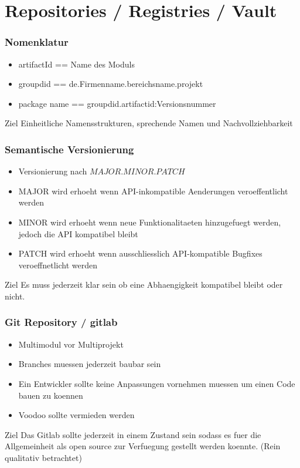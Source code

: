 \section{Repositories / Registries / Vault}
\begin{frame}
    \frametitle{Nomenklatur}
    \begin{itemize}
    \item artifactId == Name des Moduls
    \item groupdid == de.Firmenname.bereichsname.projekt
      \item package name == groupdid.artifactid:Versionsnummer
    \end{itemize}
    \begin{block}{Ziel}
      Einheitliche Namensstrukturen, sprechende Namen und Nachvollziehbarkeit
      \end{block}
\end{frame}
\begin{frame}
    \frametitle{Semantische Versionierung}
    \begin{itemize}
    \item Versionierung nach $MAJOR.MINOR.PATCH$
    \item MAJOR wird erhoeht wenn API-inkompatible Aenderungen veroeffentlicht werden
    \item MINOR wird erhoeht wenn neue Funktionalitaeten hinzugefuegt werden, jedoch die API kompatibel bleibt
    \item PATCH wird erhoeht wenn ausschliesslich API-kompatible Bugfixes veroeffnetlicht werden
    \end{itemize}
    \begin{block}{Ziel}
      Es muss jederzeit klar sein ob eine Abhaengigkeit kompatibel bleibt oder nicht.
      \end{block}
\end{frame}
\begin{frame}
    \frametitle{Git Repository / gitlab}
    \begin{itemize}
      \item Multimodul vor Multiprojekt
      \item Branches muessen jederzeit baubar sein
      \item Ein Entwickler sollte keine Anpassungen vornehmen muessen um einen Code bauen zu koennen
      \item Voodoo sollte vermieden werden
    \end{itemize}
    \begin{block}{Ziel}
        Das Gitlab sollte jederzeit in einem Zustand sein sodass es fuer die Allgemeinheit als open source zur Verfuegung gestellt werden koennte. (Rein qualitativ betrachtet) 
    \end{block}
\end{frame}


